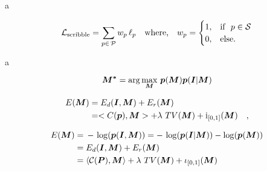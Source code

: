 \documentclass[pdftex,11pt,openright,headsepline]{book}
\begin{document}









a \newline

\begin{equation*}\label{eq:nll_gen}
\mathcal{L}_{\rm{scribble}} = \sum_{p\in\,\mathcal{P}}{w_{p}\, \ell_{p}} \quad \text{where,} \quad  w_{p} = 
\begin{cases}
  1, & \text{if}\ \ p \in \mathcal{S}  \\
  0, & \text{else.}
\end{cases}
\end{equation*}



a \newline


\begin{equation*}
\boldsymbol{M^*} = \arg\max_{\boldsymbol{M}}\,{\boldsymbol{p}(\boldsymbol{M}) \boldsymbol{p}(\boldsymbol{I}|\boldsymbol{M})}
\end{equation*}

\begin{align*}
\mathop{{}E}(\boldsymbol{M}) &= \mathop{{}E_d}(\boldsymbol{I}, \boldsymbol{M}) + \mathop{{}E_r} (\boldsymbol{M}) \\
&= <\mathop{{}C}(\boldsymbol{p}), \boldsymbol{M}> + \lambda\, \mathop{{}TV}(\boldsymbol{M}) + \mathrm{i}_{[0,1]}(\boldsymbol{M}) \quad , 
\end{align*}


\begin{align*}
\mathop{{}E}(\boldsymbol{M}) &=\, - \, \log(\boldsymbol{p}(\boldsymbol{I}, \boldsymbol{M})) = -\, \log(\boldsymbol{p}(\boldsymbol{I}|\boldsymbol{M})) - \log(\boldsymbol{p}(\boldsymbol{M})) \\
&= \mathop{{}E_d}(\boldsymbol{I}, \boldsymbol{M}) + \mathop{{}E_r} (\boldsymbol{M})\\
&= \langle\mathcal{C}(\boldsymbol{P}), \boldsymbol{M}\rangle + \lambda\, \mathop{{}TV}(\boldsymbol{M}) + \iota_{[0,1]}(\boldsymbol{M})
\end{align*}
\end{document}
